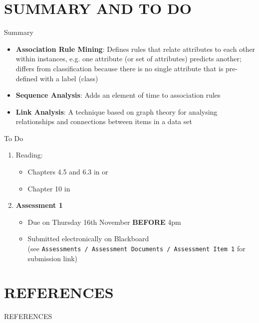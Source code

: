 \documentclass[handout]{beamer}
\newcommand{\strong}[1]{\textbf{\color{teal} #1}}
\newcommand{\stronger}[1]{\textbf{\color{purple} #1}}
\begin{document}
\section*{SUMMARY AND TO DO}
\begin{frame}{Summary}
\begin{itemize}
\item \strong{Association Rule Mining}: Defines rules that relate attributes to each other within instances, e.g. one attribute (or set of attributes) predicts another; differs from classification because there is no single attribute that is pre-defined with a label (class)
\item \strong{Sequence Analysis}: Adds an element of time to association rules
\item \strong{Link Analysis}: A technique based on graph theory for analysing relationships and connections between items in a data set
\end{itemize}
\end{frame}
\begin{frame}{To Do}
\begin{enumerate}
\item Reading:
	\begin{itemize}
	\item Chapters 4.5 and 6.3 in \cite{WFH3:2011} or \cite{WFH4:2016}
	\item Chapter 10 in \cite{LB3:2011}
	\end{itemize}
\item \stronger{Assessment 1}
	\begin{itemize}
	\item Due on Thursday 16th November \textbf{BEFORE} 4pm
	\item Submitted electronically on Blackboard\\
	(see \texttt{Assessments / Assessment Documents / Assessment Item 1} for submission link)
	\end{itemize}
\end{enumerate}
\end{frame}


\section*{REFERENCES}
\begin{frame}[allowframebreaks]{REFERENCES}


\end{frame}
\end{document}
